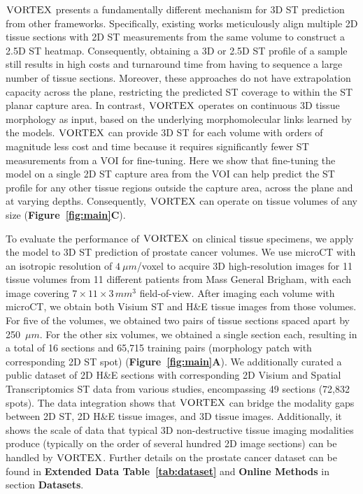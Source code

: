 $\textsc{VORTEX}$ presents a fundamentally different mechanism for 3D ST prediction from other frameworks. Specifically, existing works meticulously align multiple 2D tissue sections with 2D ST measurements from the same volume to construct a 2.5D ST heatmap\cite{dong2022deciphering, zeira2022alignment, zhou2023integrating,wang2023construction, tang2024search, shu2024efficient,li2024high, lin2024bridging}.
Consequently, obtaining a 3D or 2.5D ST profile of a sample still results in high costs and turnaround time from having to sequence a large number of tissue sections. Moreover, these approaches do not have extrapolation capacity across the plane, restricting the predicted ST coverage to within the ST planar capture area. In contrast, $\textsc{VORTEX}$ operates on continuous 3D tissue morphology as input, based on the underlying morphomolecular links learned by the models. $\textsc{VORTEX}$ can provide 3D ST for each volume with orders of magnitude less cost and time because it requires significantly fewer ST measurements from a VOI for fine-tuning. Here we show that fine-tuning the model on a single 2D ST capture area from the VOI can help predict the ST profile for any other tissue regions outside the capture area, across the plane and at varying depths. Consequently, $\textsc{VORTEX}$ can operate on tissue volumes of any size (\textbf{Figure~\ref{fig:main}C}). 


To evaluate the performance of $\textsc{VORTEX}$ on clinical tissue specimens, we apply the model to 3D ST prediction of prostate cancer volumes.
We use microCT\cite{withers2021x, palermo2025investigating} with an isotropic resolution of $4~\mu m$/voxel to acquire 3D high-resolution images for 11 tissue volumes from 11 different patients from Mass General Brigham, with each image covering $7 \times 11 \times 3\, mm^3$ field-of-view. After imaging each volume with microCT, we obtain both Visium ST and H\&E tissue images from those volumes.  For five of the volumes, we obtained two pairs of tissue sections spaced apart by 250~$\mu m$.  For the other six volumes, we obtained a single section each, resulting in a total of 16 sections and 65,715 training pairs (morphology patch with corresponding 2D ST spot) (\textbf{Figure~\ref{fig:main}A}). We additionally curated a public dataset of 2D H\&E sections with corresponding 2D Visium and Spatial Transcriptomics ST data from various studies, encompassing 49 sections (72,832 spots).
The data integration shows that $\textsc{VORTEX}$ can bridge the modality gaps between 2D ST, 2D H\&E tissue images, and 3D tissue images. 
Additionally, it shows the scale of data that typical 3D non-destructive tissue imaging modalities produce (typically on the order of several hundred 2D image sections) can be handled by $\textsc{VORTEX}$\cite{song2024analysis, coleman2024unlocking, erturk2024deep}. Further details on the prostate cancer dataset can be found in \textbf{Extended Data Table~\ref{tab:dataset}} and \textbf{Online Methods} in section \textbf{Datasets}.

